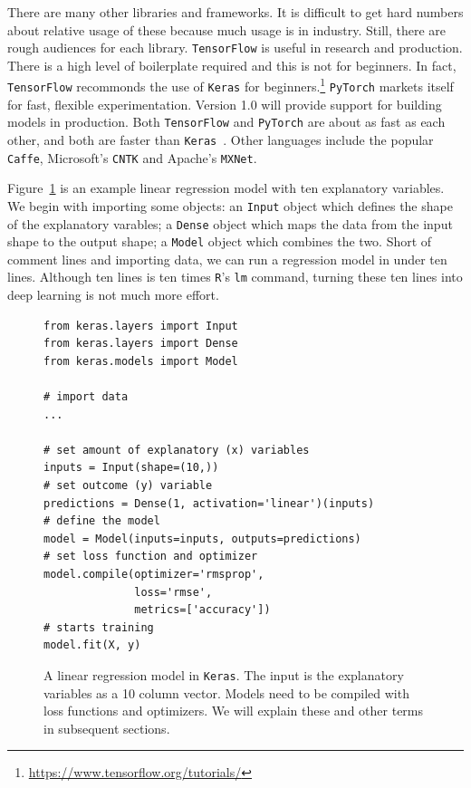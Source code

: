 \documentclass[12pt, a4paper, oneside, headinclude, footinclude]{article}
\begin{document}
There are many other libraries and frameworks. It is difficult to get hard
numbers about relative usage of these because much usage is in industry.
Still, there are rough audiences for each library. \texttt{TensorFlow} is
useful in research and production.  There is a high level of boilerplate
required and this is not for beginners.  In fact, \texttt{TensorFlow}
recommonds the use of \texttt{Keras} for
beginners.\footnote{\url{https://www.tensorflow.org/tutorials/}}
\texttt{PyTorch} markets itself for fast, flexible experimentation. Version
1.0 will provide support for building models in production. Both
\texttt{TensorFlow} and \texttt{PyTorch} are about as fast as each other, and
both are faster than \texttt{Keras}~\cite{Rosinski2017Deep}. Other languages
include the popular \texttt{Caffe}, Microsoft's \texttt{CNTK} and
Apache's \texttt{MXNet}.

Figure~\ref{alg:linreg} is an example linear regression model with ten
explanatory variables.  We begin with importing some objects: an
\texttt{Input} object which defines the shape of the explanatory varables; a
\texttt{Dense} object which maps the data from the input shape to the output
shape; a \texttt{Model} object which combines the two. Short of comment lines and
importing data, we can run a regression model in under ten lines. Although ten
lines is ten times \texttt{R}'s \texttt{lm} command, turning these ten lines
into deep learning is not much more effort.

\begin{figure}
\begin{verbatim}
from keras.layers import Input
from keras.layers import Dense
from keras.models import Model

# import data
...

# set amount of explanatory (x) variables 
inputs = Input(shape=(10,))
# set outcome (y) variable
predictions = Dense(1, activation='linear')(inputs)
# define the model
model = Model(inputs=inputs, outputs=predictions)
# set loss function and optimizer
model.compile(optimizer='rmsprop', 
              loss='rmse', 
              metrics=['accuracy'])
# starts training
model.fit(X, y)  
\end{verbatim}
    \caption[A linear regression model in\texttt{Keras}]{A linear regression model in
   \texttt{Keras}. The input is the explanatory variables as a 10 column vector.
    Models need to be compiled with loss functions and optimizers. We will
    explain these and other terms in subsequent sections.\label{alg:linreg}}
\end{figure}
\end{document}

